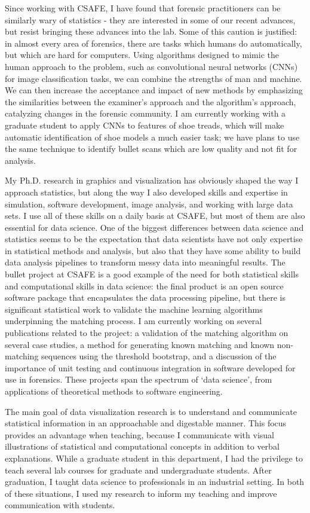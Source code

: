 \documentclass[12pt, letterpaper, sans]{moderncv}
\begin{document}
Since working with CSAFE, I have found that forensic practitioners can be similarly wary of statistics - they are interested in some of our recent advances, but resist bringing these advances into the lab. Some of this caution is justified: in almost every area of forensics, there are tasks which humans do automatically, but which are hard for computers. Using algorithms designed to mimic the human approach to the problem, such as convolutional neural networks (CNNs) for image classification tasks, we can combine the strengths of man and machine. We can then increase the acceptance and impact of new methods by emphasizing the similarities between the examiner's approach and the algorithm's approach, catalyzing changes in the forensic community. I am currently working with a graduate student to apply CNNs to features of shoe treads, which will make automatic identification of shoe models a much easier task; we have plans to use the same technique to identify bullet scans which are low quality and not fit for analysis.

My Ph.D. research in graphics and visualization has obviously shaped the way I approach statistics, but along the way I also developed skills and expertise in simulation, software development, image analysis, and working with large data sets. I use all of these skills on a daily basis at CSAFE, but most of them are also essential for data science. One of the biggest differences between data science and statistics seems to be the expectation that data scientists have not only expertise in statistical methods and analysis, but also that they have some ability to build data analysis pipelines to transform messy data into meaningful results. The bullet project at CSAFE is a good example of the need for both statistical skills and computational skills in data science: the final product is an open source software package that encapsulates the data processing pipeline, but there is significant statistical work to validate the machine learning algorithms underpinning the matching process. I am currently working on several publications related to the project: a validation of the matching algorithm on several case studies, a method for generating known matching and known non-matching sequences using the threshold bootstrap, and a discussion of the importance of unit testing and continuous integration in software developed for use in forensics. These projects span the spectrum of `data science', from applications of theoretical methods to software engineering. 

The main goal of data visualization research is to understand and communicate statistical information in an approachable and digestable manner. This focus provides an advantage when teaching, because I communicate with visual illustrations of statistical and computational concepts in addition to verbal explanations. While a graduate student in this department, I had the privilege to teach several lab courses for graduate and undergraduate students. After graduation, I taught data science to professionals in an industrial setting. In both of these situations, I used my research to inform my teaching and improve communication with students. 
\end{document}
